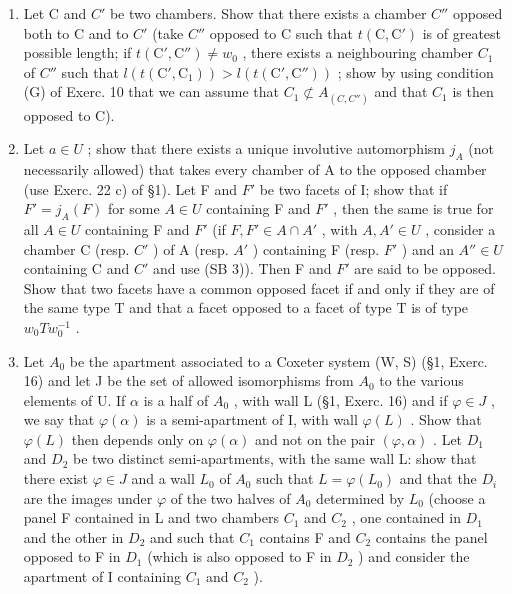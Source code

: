 \begin{enumerate}
\def\labelenumi{\alph{enumi})}
\item
  Let C and \(C'\) be two chambers. Show that there exists a chamber \(C''\) opposed both to C and to \(C'\) (take \(C''\) opposed to C such that \(t(\mathrm{C},\mathrm{C}')\) is of greatest possible length; if \(t(\mathrm{C}',\mathrm{C}'')\neq w_{0}\) , there exists a neighbouring chamber \(C_{1}\) of \(C''\) such that \(l(t(\mathrm{C}',\mathrm{C}_{1}))>l(t(\mathrm{C}',\mathrm{C}''))\) ; show by using condition (G) of Exerc. 10 that we can assume that \(C_{1}\not\subset A_{(C,C'')}\) and that \(C_{1}\) is then opposed to C).
\item
  Let \(a \in U\) ; show that there exists a unique involutive automorphism \(j_{A}\) (not necessarily allowed) that takes every chamber of A to the opposed chamber (use Exerc. 22 c) of §1). Let F and \(F'\) be two facets of I; show that if \(F' = j_{A}(F)\) for some \(A \in U\) containing F and \(F'\) , then the same is true for all \(A \in U\) containing F and \(F'\) (if \(F, F' \in A \cap A'\) , with \(A, A' \in U\) , consider a chamber C (resp. \(C'\) ) of A (resp. \(A'\) ) containing F (resp. \(F'\) ) and an \(A'' \in U\) containing C and \(C'\) and use (SB 3)). Then F and \(F'\) are said to be opposed. Show that two facets have a common opposed facet if and only if they are of the same type T and that a facet opposed to a facet of type T is of type \(w_{0}Tw_{0}^{-1}\) .
\item
  Let \(A_{0}\) be the apartment associated to a Coxeter system (W, S) (§1, Exerc. 16) and let J be the set of allowed isomorphisms from \(A_{0}\) to the various elements of U. If \(\alpha\) is a half of \(A_{0}\) , with wall L (§1, Exerc. 16) and if \(\varphi \in J\) , we say that \(\varphi(\alpha)\) is a semi-apartment of I, with wall \(\varphi(L)\) . Show that \(\varphi(L)\) then depends only on \(\varphi(\alpha)\) and not on the pair \((\varphi, \alpha)\) . Let \(D_{1}\) and \(D_{2}\) be two distinct semi-apartments, with the same wall L: show that there exist \(\varphi \in J\) and a wall \(L_{0}\) of \(A_{0}\) such that \(L = \varphi(L_{0})\) and that the \(D_{i}\) are the images under \(\varphi\) of the two halves of \(A_{0}\) determined by \(L_{0}\) (choose a panel F contained in L and two chambers \(C_{1}\) and \(C_{2}\) , one contained in \(D_{1}\) and the other in \(D_{2}\) and such that \(C_{1}\) contains F and \(C_{2}\) contains the panel opposed to F in \(D_{1}\) (which is also opposed to F in \(D_{2}\) ) and consider the apartment of I containing \(C_{1}\) and \(C_{2}\) ).
\end{enumerate}

